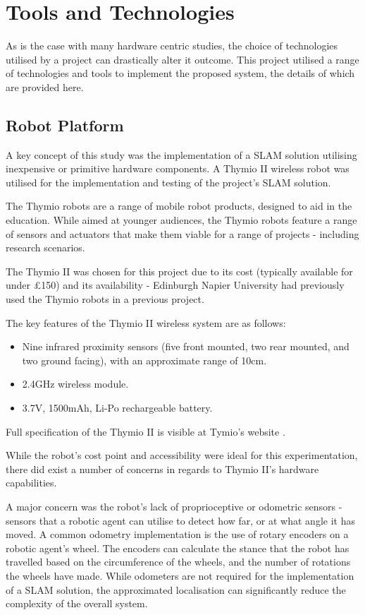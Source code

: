 \section{Tools and Technologies}
As is the case with many hardware centric studies, the choice of technologies
utilised by a project can drastically alter it outcome.
This project utilised a range of technologies and tools to implement the
proposed system, the details of which are provided here.

\subsection{Robot Platform}\label{tools_robot}
A key concept of this study was the implementation of a SLAM solution
utilising inexpensive or primitive hardware components.
A Thymio II wireless robot was utilised for the implementation and testing of
the project's SLAM solution.

The Thymio robots are a range of mobile robot products, designed to aid in the
education.
While aimed at younger audiences, the Thymio robots feature a range of
sensors and actuators that make them viable for a range of projects -
including research scenarios.

The Thymio II was chosen for this project due to its cost (typically available
for under \pounds150) and its availability  - Edinburgh Napier University had
previously used the Thymio robots in a previous project.

The key features of the Thymio II wireless system are as follows:
\begin{itemize}
\item Nine infrared proximity sensors (five front mounted, two rear mounted,
and two ground facing), with an approximate range of 10cm.
\item 2.4GHz wireless module.
\item 3.7V, 1500mAh, Li-Po rechargeable battery.
\end{itemize}
Full specification of the Thymio II is visible at Tymio's website
\cite{thymio}.

While the robot's cost point and accessibility were ideal for this
experimentation, there did exist a number of concerns in regards to Thymio
II's hardware capabilities.

A major concern was the robot's lack of proprioceptive or odometric sensors -
sensors that a robotic agent can utilise to detect how far, or at what angle
it has moved.
A common odometry implementation is the use of rotary encoders on a robotic
agent's wheel.
The encoders can calculate the stance that the robot has travelled based on
the circumference of the wheels, and the number of rotations the wheels have
made.
While odometers are not required for the implementation of a SLAM solution, the
approximated localisation can significantly reduce the complexity of the
overall system.

